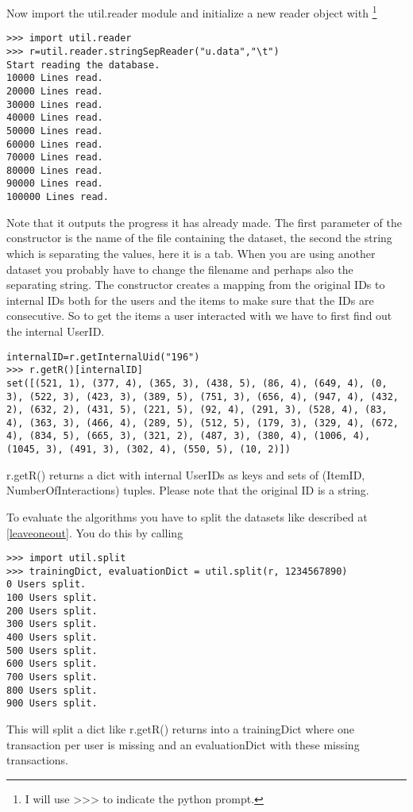 Now import the util.reader module and initialize a new reader object with
\footnote{I will use >>> to indicate the python prompt.}
\begin{lstlisting}
>>> import util.reader
>>> r=util.reader.stringSepReader("u.data","\t")
Start reading the database.
10000 Lines read.
20000 Lines read.
30000 Lines read.
40000 Lines read.
50000 Lines read.
60000 Lines read.
70000 Lines read.
80000 Lines read.
90000 Lines read.
100000 Lines read.
\end{lstlisting}
Note that it outputs the progress it has already made.
The first parameter of the constructor is the name of the file containing the dataset,
the second the string which is separating the values, here it is a tab. 
When you are using another dataset you probably have to change the filename and perhaps
also the separating string.
The constructor creates a mapping from the original IDs to internal IDs both for the users
and the items to make sure that the IDs are consecutive. So to get the items a user interacted
with we have to first find out the internal UserID.
\begin{lstlisting}
internalID=r.getInternalUid("196")
>>> r.getR()[internalID]
set([(521, 1), (377, 4), (365, 3), (438, 5), (86, 4), (649, 4), (0, 3), (522, 3), (423, 3), (389, 5), (751, 3), (656, 4), (947, 4), (432, 2), (632, 2), (431, 5), (221, 5), (92, 4), (291, 3), (528, 4), (83, 4), (363, 3), (466, 4), (289, 5), (512, 5), (179, 3), (329, 4), (672, 4), (834, 5), (665, 3), (321, 2), (487, 3), (380, 4), (1006, 4), (1045, 3), (491, 3), (302, 4), (550, 5), (10, 2)])
\end{lstlisting}
r.getR() returns a dict with internal UserIDs as keys and sets of (ItemID, NumberOfInteractions) tuples.
Please note that the original ID is a string.

To evaluate the algorithms you have to split the datasets like described at \ref{leaveoneout}.
You do this by calling
\begin{lstlisting}
>>> import util.split
>>> trainingDict, evaluationDict = util.split(r, 1234567890)
0 Users split.
100 Users split.
200 Users split.
300 Users split.
400 Users split.
500 Users split.
600 Users split.
700 Users split.
800 Users split.
900 Users split.
\end{lstlisting}
This will split a dict like r.getR() returns into a trainingDict where one transaction
per user is missing and an evaluationDict with these missing transactions.


